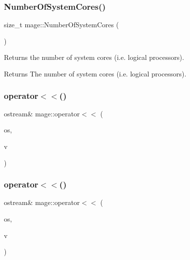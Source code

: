 \hypertarget{namespacemage_afe0cda2eaeef24c7e3ee5d7a739b81e4}{}\label{namespacemage_afe0cda2eaeef24c7e3ee5d7a739b81e4} 
\subsubsection{\texorpdfstring{Number\+Of\+System\+Cores()}{NumberOfSystemCores()}}
{\footnotesize\ttfamily size\+\_\+t mage\+::\+Number\+Of\+System\+Cores (\begin{DoxyParamCaption}{ }\end{DoxyParamCaption})}

Returns the number of system cores (i.\+e. logical processors).

\begin{DoxyReturn}{Returns}
The number of system cores (i.\+e. logical processors). 
\end{DoxyReturn}
\hypertarget{namespacemage_ac348ad49bf7e9912aa70cda1b0ca553d}{}\label{namespacemage_ac348ad49bf7e9912aa70cda1b0ca553d} 
\subsubsection{\texorpdfstring{operator$<$$<$()}{operator<<()}\hspace{0.1cm}{\footnotesize\ttfamily [1/3]}}
{\footnotesize\ttfamily ostream\& mage\+::operator$<$$<$ (\begin{DoxyParamCaption}\item[{ostream \&}]{os,  }\item[{const X\+M\+F\+L\+O\+A\+T2 \&}]{v }\end{DoxyParamCaption})}

\hypertarget{namespacemage_a44b2d3046802608544402245919f219b}{}\label{namespacemage_a44b2d3046802608544402245919f219b} 
\subsubsection{\texorpdfstring{operator$<$$<$()}{operator<<()}\hspace{0.1cm}{\footnotesize\ttfamily [2/3]}}
{\footnotesize\ttfamily ostream\& mage\+::operator$<$$<$ (\begin{DoxyParamCaption}\item[{ostream \&}]{os,  }\item[{const X\+M\+F\+L\+O\+A\+T3 \&}]{v }\end{DoxyParamCaption})}

